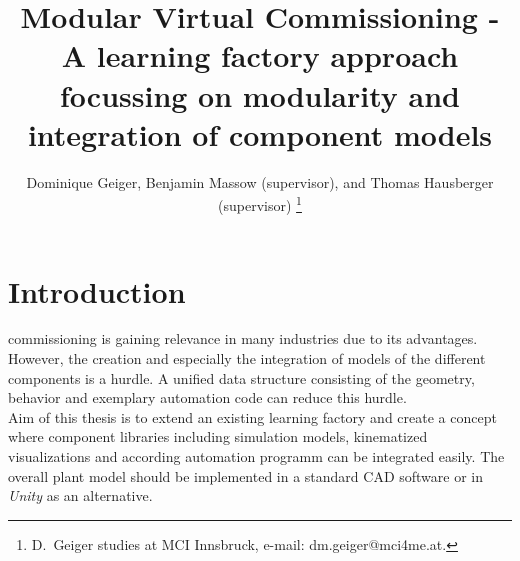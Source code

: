 \documentclass[journal,9pt]{IEEEtran}
\begin{document}
%
\title{Modular Virtual Commissioning - A learning factory approach focussing on modularity and integration of component models}
%
%
%

\author{Dominique Geiger, Benjamin Massow (supervisor), and Thomas Hausberger (supervisor)
\thanks{D.~Geiger studies at MCI Innsbruck, e-mail: dm.geiger@mci4me.at.}
}



\maketitle






\section{Introduction}
	 commissioning is gaining relevance in many industries due to its advantages. However, the creation and especially the integration of models of the different components is a hurdle. A unified data structure consisting of the geometry, behavior and exemplary automation code can reduce this hurdle. \\
	Aim of this thesis is to extend an existing learning factory and create a concept where component libraries including simulation models, kinematized visualizations and according automation programm can be integrated easily. The overall plant model should be implemented in a standard CAD software or in \textit{Unity} as an alternative.










\end{document}
